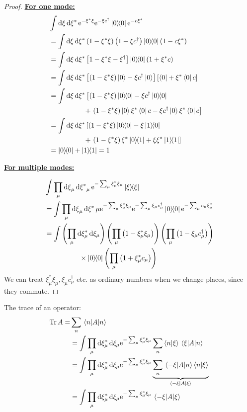 \begin{proof}
\underline{\textbf{For one mode:}}
\begin{align*}
&\int \dxi\dxis\e^{-\xi^*\xi}\e^{-\xi c^\dagger}\dyad 0\e^{-c\xi^*}& \\
&=\int \dxi\dxis \left(1-\xi^*\xi\right)\left(1-\xi c^\dagger\right)\dyad 0 \left(1-c\xi^*\right)\\
&=\int \dxi\dxis \left[1-\xi^*\xi -\xi ^\dagger\right]\dyad 0 \left(1+\xi^* c\right)\\
&=\int \dxi\dxis\left[\left(1-\xi^*\xi\right)\ket 0 - \xi c^\dagger \ket 0\right]\left[\bra 0 + \xi^*\bra 0 c\right] \\
&= \int \dxi\dxis \left[\left( 1-\xi^*\xi\right)\dyad 0 -\xi c^\dagger \dyad 0 \right. \\
&\qquad\qquad\quad +\left.\left(1-\xi^*\xi\right)\ket 0\xi^*\bra 0 c - \xi c^\dagger\ket 0\xi^*\bra 0 c\right] \\
&=\int \dxi\dxis \left[\left(1-\xi^*\xi\right)\dyad 0 -\xi \dyad{1}{0} \right.\\
&\qquad\qquad\quad +\left.\left(1-\xi^*\xi\right)\xi^*\dyad{0}{1} + \xi\xi^* \dyad 1\right]\\
&= \dyad 0 + \dyad 1 = 1
\end{align*}

\underline{\textbf{For multiple modes:}}

\begin{align*}
&\int \prod_\mu \dxi_\mu \dxis_\mu \e^{-\sum_\mu \xi_\mu^* \xi_\mu}\dyad \xi \\
&=\int \prod_\mu\dxi_\mu\dxis\mu\e^{-\sum_\mu\xi_\mu^*\xi_\mu}\e^{-\sum_\mu\xi_\mu c_\mu^\dagger}\dyad 0\e^{-\sum_\mu c_\mu\xi_\mu^*}\\
&= \int \left(\prod_{\mu}\dd{\xi_\mu^*}\dd{\xi_\mu}\right)\left(\prod_\mu\left(1-\xi_\mu^*\xi_\mu\right)\right)\left(\prod_\mu\left(1-\xi_\mu c_\mu^\dagger\right)\right) \\
&\qquad\qquad\quad \times \dyad 0 \left(\prod_\mu\left(1+\xi_\mu^* c_\mu\right)\right)
\end{align*}
We can treat \(\xi_\mu^*\xi_\mu, \xi_\mu c_\mu^\dagger\) etc. as ordinary numbers when we change places, since they commute.

\end{proof}

The trace of an operator:
\begin{align}
\label{eq:Trace_fermion_coherent}
\Tr A =&\sum_n\ev{A}{n} \nonumber \\
&= \int \prod_{\mu}\dd{\xi_\mu^*}\dd{\xi_\mu \e^{-\sum_\mu\xi_\mu^*\xi_\mu}}\sum_n\braket{n}{\xi}\mel{\xi}{A}{n}\nonumber \\
&=\int \prod_{\mu}\dd{\xi_\mu^*}\dd{\xi_\mu \e^{-\sum_\mu\xi_\mu^*\xi_\mu}}\underbrace{\sum_n \mel{-\xi}{A}{n}\braket{n}{\xi}}_{\mel{-\xi}{A}{\xi}} \nonumber\\
&=\int \prod_{\mu}\dd{\xi_\mu^*}\dd{\xi_\mu \e^{-\sum_\mu\xi_\mu^*\xi_\mu}}\mel{-\xi}{A}{\xi} 
\end{align}

